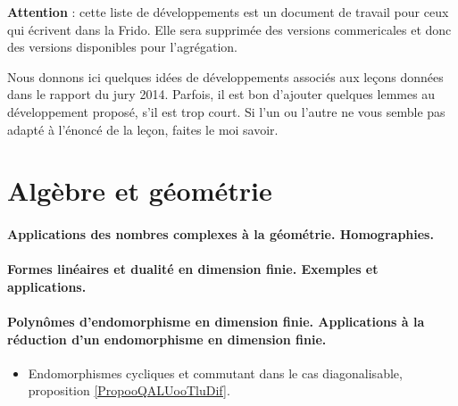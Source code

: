 
{\bf Attention } : cette liste de développements est un document de travail pour ceux qui écrivent dans la Frido. Elle sera supprimée des versions commericales et donc des versions disponibles pour l'agrégation.

\vspace{2cm}


Nous donnons ici quelques idées de développements associés aux leçons données dans le rapport du jury 2014\cite{VDPpTKg}. Parfois, il est bon d'ajouter quelques lemmes au développement proposé, s'il est trop court. Si l'un ou l'autre ne vous semble pas adapté à l'énoncé de la leçon, faites le moi savoir.

\section{Algèbre et géométrie}

\paragraph{Applications des nombres complexes à la géométrie. Homographies.}
\paragraph{Formes linéaires et dualité en dimension finie. Exemples et applications.}
\paragraph{Polynômes d'endomorphisme en dimension finie. Applications à la réduction d'un endomorphisme en dimension finie.}
\begin{itemize}
    \item Endomorphismes cycliques et commutant dans le cas diagonalisable, proposition \ref{PropooQALUooTluDif}.
\end{itemize}
